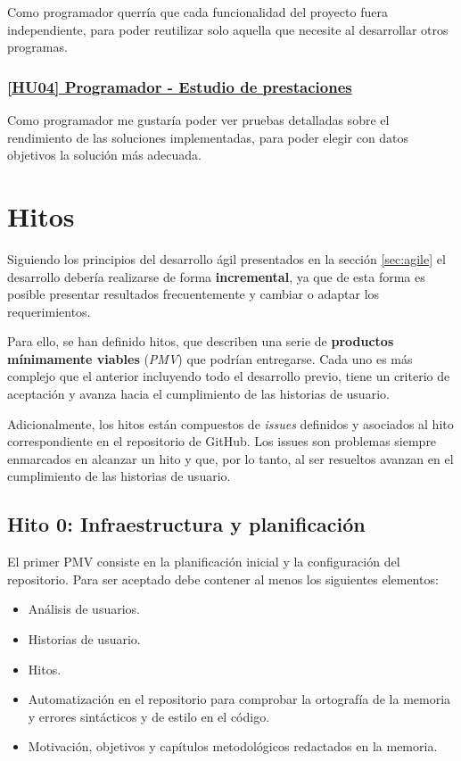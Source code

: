 Como programador querría que cada funcionalidad del proyecto fuera independiente, para poder reutilizar solo aquella que necesite al desarrollar otros programas.

\subsubsection*{\href{https://github.com/dipzza/ultrastar-song2txt/issues/11}{[HU04] Programador - Estudio de prestaciones}}

Como programador me gustaría poder ver pruebas detalladas sobre el rendimiento de las soluciones implementadas, para poder elegir con datos objetivos la solución más adecuada.


\section{Hitos}
\label{sec:hitos}

Siguiendo los principios del desarrollo ágil presentados en la sección \ref{sec:agile} el desarrollo debería realizarse de forma \textbf{incremental}, ya que de esta forma es posible presentar resultados frecuentemente y cambiar o adaptar los requerimientos.

Para ello, se han definido hitos, que describen una serie de \textbf{productos mínimamente viables} (\textit{PMV}) que podrían entregarse. Cada uno es más complejo que el anterior incluyendo todo el desarrollo previo, tiene un criterio de aceptación y avanza hacia el cumplimiento de las historias de usuario.

Adicionalmente, los hitos están compuestos de \textit{issues} definidos y asociados al hito correspondiente en el repositorio de GitHub. Los issues son problemas siempre enmarcados en alcanzar un hito y que, por lo tanto, al ser resueltos avanzan en el cumplimiento de las historias de usuario.


\subsection*{Hito 0: Infraestructura y planificación}

El primer PMV consiste en la planificación inicial y la configuración del repositorio. Para ser aceptado debe contener al menos los siguientes elementos:

\begin{itemize}
	\item{Análisis de usuarios.}
	\item{Historias de usuario.}
	\item{Hitos.}
	\item{Automatización en el repositorio para comprobar la ortografía de la memoria y errores sintácticos y de estilo en el código.}
	\item{Motivación, objetivos y capítulos metodológicos redactados en la memoria.}
\end{itemize}

